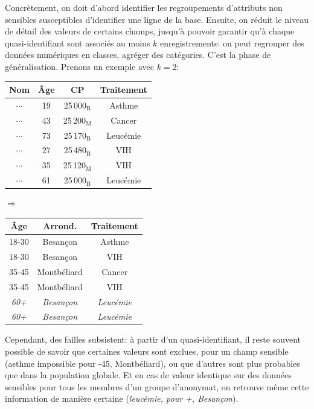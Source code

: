 \documentclass[a4paper,11pt]{article} %
\begin{document}
Concrètement, on doit d'abord identifier les regroupements d'attributs non sensibles susceptibles d'identifier une ligne de la base.
Ensuite, on réduit le niveau de détail des valeurs de certains champs, jusqu'à pouvoir garantir qu'à chaque quasi-identifiant sont associés au moins $k$ enregistrements: on peut regrouper des données numériques en classes, agréger des catégories. C'est la phase de généralisation. Prenons un exemple avec $k=2$:
\begin{center}
    \small\sffamily
\begin{tabular}{|c|c|c|c|}
    \hline 
    \textbf{Nom} & \textbf{Âge} & \textbf{CP} & \textbf{Traitement} \\ 
    \hline \hline
    $\cdots$ & 19 & 25\,000$_\text{B}$ & Asthme \\ 
    \hline 
    $\cdots$ & 43 & 25\,200$_\text{M}$ & Cancer \\ 
    \hline 
    $\cdots$ & 73 & 25\,170$_\text{B}$ & Leucémie \\ 
    \hline 
    $\cdots$ & 27 & 25\,480$_\text{B}$ & VIH \\ 
    \hline 
    $\cdots$ & 35 & 25\,120$_\text{M}$ & VIH \\ 
    \hline 
    $\cdots$ & 61 & 25\,000$_\text{B}$ & Leucémie \\ 
    \hline 
\end{tabular} 
$\Rightarrow$
\begin{tabular}{|c|c|c|}
    \hline 
    \textbf{Âge} & \textbf{Arrond.} & \textbf{Traitement} \\ 
    \hline \hline
    18-30 & Besançon & Asthme \\ 
    \hline 
    18-30 & Besançon & VIH \\ 
    \hline \hline
    35-45 & Montbéliard & Cancer \\ 
    \hline 
    35-45 & Montbéliard & VIH \\ 
    \hline \hline
    \emph{60+} & \emph{Besançon} & \emph{Leucémie} \\ 
    \hline 
    \emph{60+} & \emph{Besançon} & \emph{Leucémie} \\ 
    \hline 
\end{tabular}
\end{center}
Cependant, des failles subsistent: à partir d'un quasi-identifiant, il reste souvent possible de savoir que certaines valeurs sont exclues, pour un champ sensible (asthme impossible pour -45, Montbéliard\fg{}), ou que d'autres sont plus probables que dans la population globale.
Et en cas de valeur identique sur des données sensibles pour tous les membres d'un groupe d'anonymat, on retrouve même cette information de manière certaine (\emph{leucémie, pour +, Besançon\fg{}}).
\end{document}
